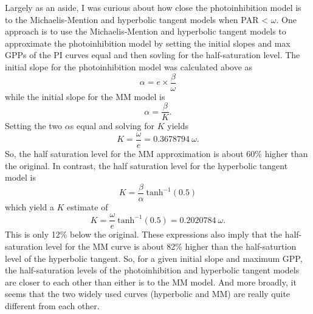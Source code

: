 \documentclass[12pt]{article}
\begin{document}
{Largely as an aside, I was curious about how close the photoinhibition model 
is to the Michaelis-Mention and hyperbolic tangent models 
when PAR < $\omega$. 
One approach is to use the Michaelis-Mention and hyperbolic tangent models to approximate
the photoinhibition model by setting the initial slopes and max GPPs of the PI curves
equal and then sovling for the half-saturation level.
The initial slope for the photoinhibition model was calculated above as
%
\begin{equation} \label{eq:alpha-MM}
    \alpha =  e \times \frac{\beta}{\omega}
\end{equation}
%
while the initial slope for the MM model is
%
\begin{equation} \label{eq:alpha-MM}
    \alpha = \frac{\beta}{K}.
\end{equation}
%
Setting the two $\alpha$s equal and solving for $K$ yields
%
\begin{equation} \label{eq:k_tanh}
    K = \frac{\omega}{e} = 0.3678794 ~ \omega.
\end{equation}
%
So, the half saturation level for the MM approximation is about 60\% higher 
than the original.
In contrast, the half saturation level for the hyperbolic tangent model is 
%
\begin{equation} \label{eq:k_tanh-exp}
    K = \frac{\beta}{\alpha}~\text{tanh}^{-1}\left(0.5\right)
\end{equation}
%
which yield a $K$ estimate of 
%
\begin{equation} \label{eq:k_tanh}
    K = \frac{\omega}{e}~\text{tanh}^{-1}\left(0.5\right) 
      = 0.2020784 ~ \omega.
\end{equation}
%
This is only 12\% below the original.
These expressions also imply that the half-saturation level 
for the MM curve is about 82\% higher than the half-saturtion 
level of the hyperbolic tangent.
So, for a given initial slope and maximum GPP,  
the half-saturation levels of the photoinhibition and hyperbolic tangent models 
are closer to each other than either is to the MM model. 
And more broadly, it seems that the two widely used curves (hyperbolic and MM)
are really quite different from each other.









}
\end{document}
